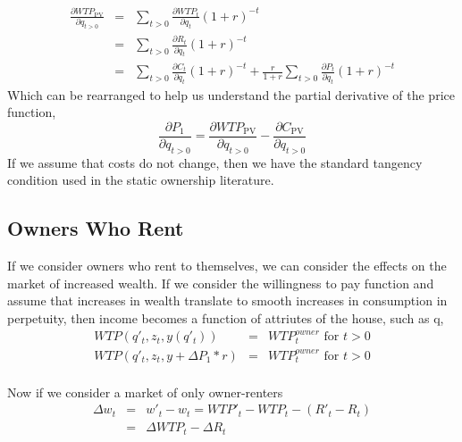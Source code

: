 \documentclass[ecta,nameyear,draft]{econsocart}
\theoremstyle{plain}
\theoremstyle{remark}
\begin{document}
\begin{eqnarray}
\frac{\partial \mathit{WTP}_{\mathrm{PV}}}{\partial q_{t>0}}&=&\sum_{t>0} \frac{\partial \mathit{WTP}_t}{\partial q_t}(1+r)^{-t}\\ \label{pvmwtp}
&=&\sum_{t>0} \frac{\partial R_t}{\partial q_t}(1+r)^{-t}\nonumber\\
&=&\sum_{t>0} \frac{\partial C_t}{\partial q_t}(1+r)^{-t}+\frac{r}{1+r}\sum_{t>0} \frac{\partial P_t}{\partial q_t}(1+r)^{-t}\nonumber
\end{eqnarray}
Which can be rearranged to help us understand the partial derivative of the price function,
\begin{equation}
	\frac{\partial P_1} {\partial q_{t>0}}=\frac{\partial \mathit{WTP}_{\mathrm{PV}}}{\partial q_{t>0}}-\frac{\partial C_{\mathrm{PV}}}{\partial q_{t>0}}
\end{equation}
If we assume that costs do not change, then we have the standard tangency condition used in the static ownership literature.

\subsection{Owners Who Rent}
If we consider owners who rent to themselves, we can consider the effects on the market of increased wealth.
If we consider the willingness to pay function and assume that increases in wealth translate to smooth increases in consumption in perpetuity, then income becomes a function of attriutes of the house, such as q, 
\begin{eqnarray}
	\mathit{WTP}(q'_t,z_t,y(q'_t))&=&\mathit{WTP}_t^{\mathit{owner}} \text{ for } t>0\\
	\mathit{WTP}(q'_t,z_t,y+\Delta P_1*r)&=&\mathit{WTP}_t^{\mathit{owner}} \text{ for } t>0\\
\end{eqnarray}



Now if we consider a market of only owner-renters
\begin{eqnarray}
\Delta w_t&=&w'_t-w_t=WTP'_t-WTP_t-(R'_t-R_t)\\
&=&\Delta\mathit{WTP}_t-\Delta R_t
\end{eqnarray}
\end{document}
